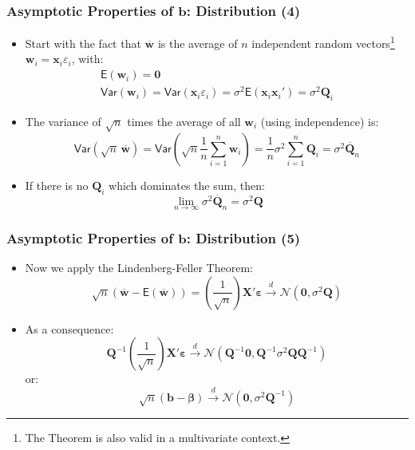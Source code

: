 \documentclass[10pt]{beamer}
\newcommand{\var}{\mathsf{Var}}
\theoremstyle{definition}
\begin{document}
\begin{frame}[fragile]
\frametitle{Asymptotic Properties of $\mathbf{b}$: Distribution (4)}
\begin{itemize}
	\item Start with the fact that $\overline{\mathbf{w}}$ is the average of $n$ independent random vectors\footnote{The Theorem is also valid in a multivariate context.} $\mathbf{w}_{i} = \mathbf{x}_{i}\varepsilon_{i}$, with: 
	\[
		\begin{array}{lcl}
			\mathsf{E}(\mathbf{w}_{i}) = \mathbf{0}\\
			\var(\mathbf{w}_{i}) = \var(\mathbf{x}_{i}\varepsilon_{i}) = \sigma^{2}\mathsf{E}(\mathbf{x}_{i}\mathbf{x}_{i}') = \sigma^{2}\mathbf{Q}_{i}
		\end{array}
	\]
	\item The variance of $\sqrt{n}$ times the average of all $\mathbf{w}_{i}$ (using independence) is:
	\[
		\var(\sqrt{n}\,\overline{\mathbf{w}}) = \var\left(\sqrt{n}\frac{1}{n}\sum_{i=1}^{n}\mathbf{w}_{i}\right) = \frac{1}{n}\sigma^{2}\sum_{i=1}^{n}\mathbf{Q}_{i} = \sigma^{2}\overline{\mathbf{Q}}_{n}
	\]
	\item If there is no $\mathbf{Q}_{i}$ which dominates the sum, then:
	\[
		\lim_{n\to\infty}\sigma^{2}\overline{\mathbf{Q}}_{n} = \sigma^{2}\mathbf{Q}
	\]
\end{itemize}
\end{frame}

\begin{frame}[fragile]
\frametitle{Asymptotic Properties of $\mathbf{b}$: Distribution (5)}
\begin{itemize}
	\item Now we apply the Lindenberg-Feller Theorem:
	\[
		\sqrt{n}(\overline{\mathbf{w}} - \mathsf{E}(\overline{\mathbf{w}})) = \left(\frac{1}{\sqrt{n}}\right) \mathbf{X'}\bm\varepsilon \overset{d}{\to} \mathcal{N}(\mathbf{0},\sigma^{2}\mathbf{Q})
	\]
	\item As a consequence:
	\[
		\mathbf{Q}^{-1}\left(\frac{1}{\sqrt{n}}\right) \mathbf{X'}\bm\varepsilon \overset{d}{\to} \mathcal{N}(\mathbf{Q}^{-1}\mathbf{0},\mathbf{Q}^{-1}\sigma^{2}\mathbf{Q}\mathbf{Q}^{-1})
	\]
	or:
	\[
		\sqrt{n}(\mathbf{b} - \bm\beta) \overset{d}{\to} \mathcal{N}(\mathbf{0},\sigma^{2}\mathbf{Q}^{-1})
	\]
\end{itemize}
\end{frame}
\end{document}
